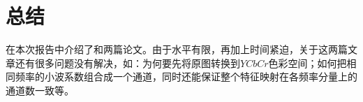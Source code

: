 \documentclass[UTF8]{ctexart}
\begin{document}
        

            


	\section{总结}
		\indent 在本次报告中介绍了\cite{huang2017wavelet}和\cite{xu2020learning}两篇论文。由于水平有限，再加上时间紧迫，关于这两篇文章还有很多问题没有解决，如：为何要先将原图转换到$YCbCr$色彩空间；如何把相同频率的小波系数组合成一个通道，同时还能保证整个特征映射在各频率分量上的通道数一致等。
		

		
	
	
%
%

\end{document}
